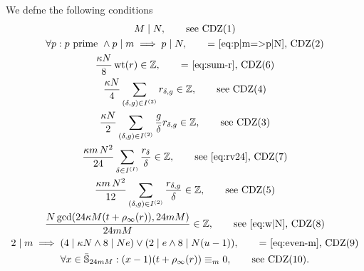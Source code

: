 \documentclass{article}
\begin{document}
\begin{Definition}
  We defne the following conditions
  \begingroup
  \def\CDZ#1{CDZ(#1)}
  \begin{gather}
    \divides{M}{N},
    \qquad
    \text{see \CDZ{1}}
    \\
    \forall p:
    p\text{ prime } \land \divides{p}{m} \implies \divides{p}{N},
    \qquad
    \text{= \eqref{eq:p|m=>p|N}, \CDZ{2}}
    \label{eq:conditionPrimeDivisors?(nn,m)}
    \\
    \frac{\kappa N}{8}  \weight(r) \in \setZ,
    \qquad
    \text{= \eqref{eq:sum-r}, \CDZ{6}}
    \label{eq:conditionSumExponentsPure?(nn,rspec,m)}
    \\
    \frac{\kappa N}{4} \sum_{(\delta,g) \in I^{(2)}} r_{\delta,g} \in \setZ,
    \qquad
    \text{see \CDZ{4}}
    \label{eq:conditionSumExponentsProperGeneralized?(nn,rspec,m)}
    \\
    \frac{\kappa N}{2} \sum_{(\delta,g) \in I^{(2)}} \frac{g}{\delta}
    r_{\delta,g}
    \in \setZ,
    \qquad
    \text{see \CDZ{3}}
    \label{eq:conditionGSigma0?(nn,rspec,m)}
    \\
    \frac{\kappa m \, N^2}{24} \sum_{\delta\in I^{(I)}}
    \frac{r_\delta}{\delta}  \in \setZ,
    \qquad
    \text{see \eqref{eq:rv24}, \CDZ{7}}
    \label{eq:conditionSigma0Pure?(nn,mm,r,m)}
    \\
    \frac{\kappa m \, N^2}{12} \sum_{(\delta,g)\in I^{(2)}}
    \frac{r_{\delta,g}}{\delta} \in \setZ,
    \qquad
    \text{see \CDZ{5}}
    \label{eq:conditionSigma0ProperGeneralized?(nn,rspec,m)}
    \\
    \frac{N \gcd(24 \kappa M (t + \rho_\infty(r)), 24 m M)}{24 m M} \in \setZ,
    \qquad
    \text{see \eqref{eq:w|N}, \CDZ{8}}
    \label{eq:conditionNDivosor?(nn,rspec,m,t)}
    \\
    \divides{2}{m} \implies (\divides{4}{\kappa N} \land \divides{8}{N e})
    \lor
    (\divides{2}{e} \land \divides{8}{N(u-1)}),
    \qquad
    \text{= \eqref{eq:even-m}, \CDZ{9}}
    \label{eq:conditionEvenMultiplier?(nn,rspec,m)}
    \\
    \forall x\in\bar{\setS}_{24mM}: (x-1) (t + \rho_\infty(r))
    \equiv_m 0,
    \qquad
    \text{see \CDZ{10}}.
    \label{eq:conditionOrbitLength?(nn,mm,r,rtilde,m,t)}
  \end{gather}
  \endgroup
\end{Definition}
\end{document}
